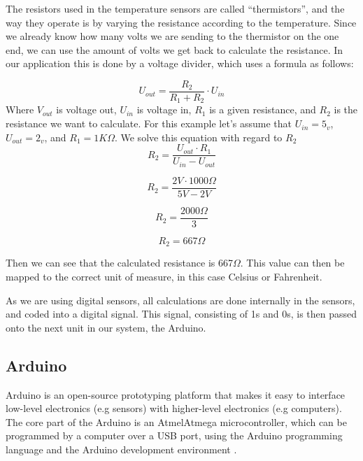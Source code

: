 The resistors used in the temperature sensors are called “thermistors”, and the way they operate is by varying the resistance according to the temperature. Since we already know how many volts we are sending to the thermistor on the one end, we can use the amount of volts we get back to calculate the resistance. In our application this is done by a voltage divider, which uses a formula as follows: 

\begin{equation}
U_{out}=\frac{R_{2}}{R_{1}+R_{2}}\cdot U_{in} 
\label{eq:vdiv1}
\end{equation}
Where $V_{out}$ is voltage out, $U_{in}$ is voltage in, $R_{1}$ is a given resistance, and $R_{2}$ is the resistance we want to calculate. For this example let's assume that $U_{in} = 5_{v}$, $U_{out} = 2_{v}$, and $R_{1} = 1K\Omega$. We solve this equation with regard to $R_{2}$
\begin{equation}
R_{2} = \frac{U_{out} \cdot R_{1}}{U_{in}-U_{out}}
\end{equation} 

\begin{equation}
R_{2} = \frac{2V \cdot 1000\Omega}{5V-2V}
\end{equation} 

\begin{equation}
R_{2} = \frac{2000\Omega}{3}
\end{equation} 

\begin{equation}
R_{2} = 667\Omega
\end{equation} 

Then we can see that the calculated resistance is 667$\Omega$. This value can then be mapped to the correct unit of measure, in this case Celsius or Fahrenheit. 

As we are using digital sensors, all calculations are done internally in the sensors, and coded into a digital signal. This signal, consisting of 1s and 0s, is then passed onto the next unit in our system, the Arduino.  

\subsection{Arduino}

Arduino is an open-source prototyping platform that makes it easy to interface low-level electronics (e.g sensors) with higher-level electronics (e.g computers). The core part of the Arduino is an Atmel\texttrademark Atmega microcontroller, which can be programmed by a computer over a USB port, using the Arduino programming language and the Arduino development environment \citep{arduino}.

